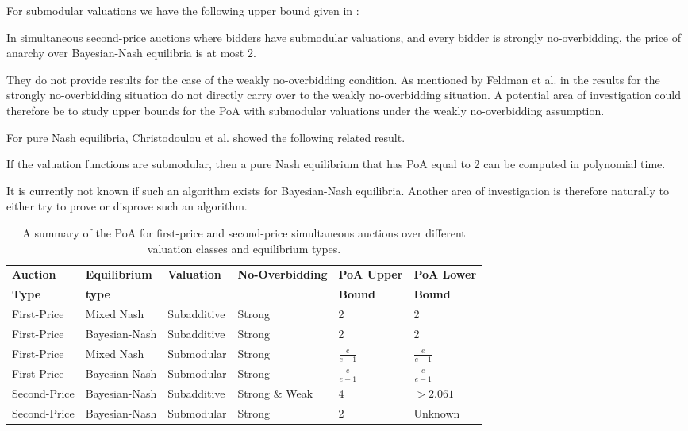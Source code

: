 For submodular valuations we have the following upper bound given in \cite{Christodoulou2016Bayesian}:
\begin{theorem}
  In simultaneous second-price auctions where bidders have submodular valuations, and every bidder is strongly no-overbidding, the price of anarchy over Bayesian-Nash equilibria is at most 2.
\end{theorem}
They do not provide results for the case of the weakly no-overbidding condition. As mentioned by Feldman et al. in \cite{10.1145/2488608.2488634} the results for the strongly no-overbidding situation do not directly carry over to the weakly no-overbidding situation. A potential area of investigation could therefore be to study upper bounds for the PoA with submodular valuations under the weakly no-overbidding assumption.

For pure Nash equilibria, Christodoulou et al. \cite{Christodoulou2016Bayesian} showed the following related result.
\begin{theorem}
  If the valuation functions are submodular, then a pure Nash equilibrium that has PoA equal to 2 can be computed in polynomial time.
\end{theorem}
It is currently not known if such an algorithm exists for Bayesian-Nash equilibria. Another area of investigation is therefore naturally to either try to prove or disprove such an algorithm.


\begin{table}[t]
  \centering
  \begin{tabular}{|l|l|l|l|l|l|}
    \hline
    \textbf{Auction} & \textbf{Equilibrium} & \textbf{Valuation} & \textbf{No-Overbidding} & \textbf{PoA Upper} & \textbf{PoA Lower} \\
    \textbf{Type} & \textbf{type} &  &  & \textbf{Bound} & \textbf{Bound} \\
    \hline
    First-Price & Mixed Nash & Subadditive & Strong & 2 & 2 \\
    \hline
    First-Price & Bayesian-Nash & Subadditive & Strong & 2 & 2 \\
    \hline
    First-Price & Mixed Nash & Submodular & Strong & \( \frac{e}{e - 1} \) & \( \frac{e}{e - 1} \) \\
    \hline
    First-Price & Bayesian-Nash & Submodular & Strong & \( \frac{e}{e - 1} \) & \( \frac{e}{e - 1} \) \\
    \hline
    Second-Price & Bayesian-Nash & Subadditive & Strong \& Weak & 4 & \( > 2.061 \) \\
    \hline
    Second-Price & Bayesian-Nash & Submodular & Strong & 2 & Unknown  \\
    \hline
  \end{tabular}
  \caption{A summary of the PoA for first-price and second-price simultaneous auctions over different valuation classes and equilibrium types.}
  \label{tab:improved_poa_bounds}
\end{table}


